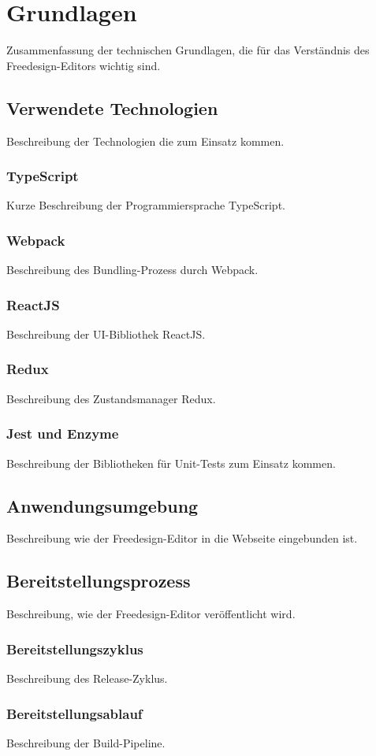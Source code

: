 \chapter{Grundlagen}
Zusammenfassung der technischen Grundlagen, die für das Verständnis des Freedesign-Editors wichtig sind.



\section{Verwendete Technologien}
Beschreibung der Technologien die zum Einsatz kommen.

\subsection{TypeScript}
Kurze Beschreibung der Programmiersprache TypeScript.

\subsection{Webpack}
Beschreibung des Bundling-Prozess durch Webpack.

\subsection{ReactJS}
Beschreibung der UI-Bibliothek ReactJS.

\subsection{Redux}
Beschreibung des Zustandsmanager Redux.

\subsection{Jest und Enzyme}
Beschreibung der Bibliotheken für Unit-Tests zum Einsatz kommen.

\section{Anwendungsumgebung}
Beschreibung wie der Freedesign-Editor in die Webseite eingebunden ist.

\section{Bereitstellungsprozess}
Beschreibung, wie der Freedesign-Editor veröffentlicht wird.

\subsection{Bereitstellungszyklus}
Beschreibung des Release-Zyklus.

\subsection{Bereitstellungsablauf}
Beschreibung der Build-Pipeline.
